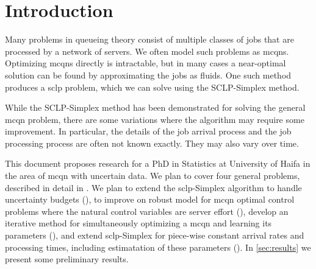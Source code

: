 \documentclass[11pt,a4paper,titlepage]{article}
\theoremstyle{definition}
\theoremstyle{plain}
\begin{document}
    \section{Introduction}
    \label{sec:introduction}


    Many problems in queueing theory consist of multiple classes of jobs
    that are processed by a network of servers.
    We often model such problems as \Glspl{mcqn}.
    Optimizing \glspl{mcqn} directly is intractable,
    but in many cases a near-optimal solution can be found by approximating the jobs as fluids.
    One such method produces a \gls{sclp} problem,
    which we can solve using the SCLP-Simplex method.


    While the SCLP-Simplex method has been demonstrated for solving the general \gls{mcqn} problem,
    there are some variations where the algorithm may require some improvement.
    In particular,
    the details of the job arrival process and the job processing process are often not known exactly.
    They may also vary over time.

    This document proposes research for a PhD in Statistics at University of Haifa in the area of \gls{mcqn} with uncertain data.
    We plan to cover four general problems,
    described in detail in .
    We plan to extend the \gls{sclp}-Simplex algorithm to handle uncertainty budgets (),
    to improve on \autocite{bertsimas2014robust} robust model for \gls{mcqn} optimal control problems where the natural control variables are server effort (),
    develop an iterative method for simultaneously optimizing a \gls{mcqn} and learning its parameters (),
    and extend \gls{sclp}-Simplex for piece-wise constant arrival rates and processing times,
    including estimatation of these parameters ().
    In \cref{sec:results} we present some preliminary results.
\end{document}
